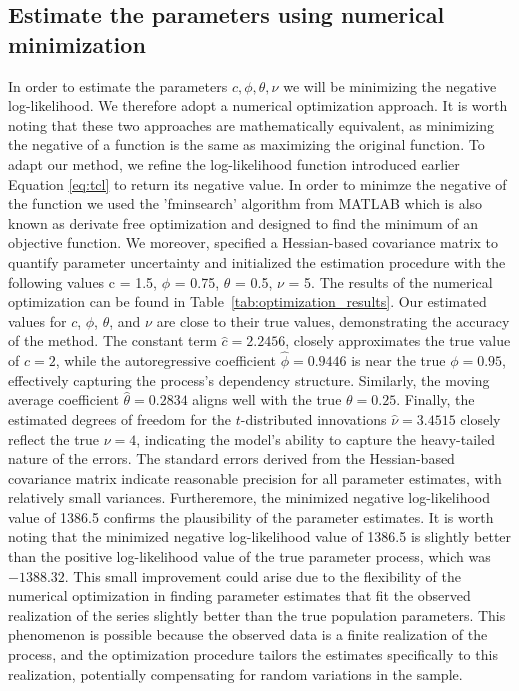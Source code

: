 \documentclass[12pt]{article}
\begin{document}
\subsection{Estimate the parameters using numerical minimization}
In order to estimate the parameters $c, \phi, \theta,\nu$ we will be minimizing the negative log-likelihood. We therefore adopt a numerical optimization approach. It is worth noting that these two approaches are mathematically equivalent, as minimizing the negative of a function is the same as maximizing the original function.
To adapt our method, we refine the log-likelihood function introduced earlier Equation \eqref{eq:tcl} to return its negative value.
In order to minimze the negative of the function we used the 'fminsearch' algorithm from MATLAB which is also known as derivate free optimization  and designed to find the minimum of an objective function. 
We moreover, specified a Hessian-based covariance matrix to quantify parameter uncertainty and initialized the estimation procedure with the following values c = 1.5, $\phi$ = 0.75, $\theta$ = 0.5, $\nu$ = 5.
The results of the numerical optimization can be found in Table~\ref{tab:optimization_results}. Our estimated values for \(c\), \(\phi\), \(\theta\), and \(\nu\) are close to their true values, demonstrating the accuracy of the method.
The constant term  \(\hat{c} = 2.2456\), closely approximates the true value of \(c = 2\),  while the autoregressive coefficient  \(\hat{\phi} = 0.9446\) is near the true \(\phi = 0.95\), effectively capturing the process's dependency structure. Similarly, the moving average coefficient \(\hat{\theta} = 0.2834\) aligns well with the true \(\theta = 0.25\). Finally, the estimated degrees of freedom for the \(t\)-distributed innovations \(\hat{\nu} = 3.4515\) closely reflect the true \(\nu = 4\), indicating the model's ability to capture the heavy-tailed nature of the errors.
The standard errors derived from the Hessian-based covariance matrix indicate reasonable precision for all parameter estimates, with relatively small variances. Furtheremore, the minimized negative log-likelihood value of 1386.5 confirms the plausibility of the parameter estimates. It is worth noting that the minimized negative log-likelihood value of 1386.5 is slightly better than the positive log-likelihood value of the true parameter process, which was \(-1388.32\). This small improvement could arise due to the flexibility of the numerical optimization in finding parameter estimates that fit the observed realization of the series slightly better than the true population parameters. This phenomenon is possible because the observed data is a finite realization of the process, and the optimization procedure tailors the estimates specifically to this realization, potentially compensating for random variations in the sample.
\end{document}
